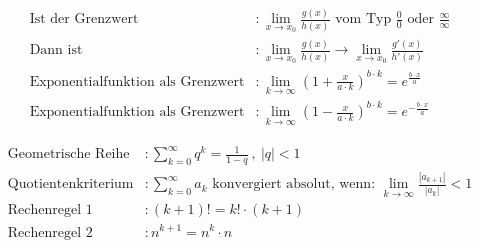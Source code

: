 \documentclass[12pt]{article}
\begin{document}
    \begin{tcolorbox}[
    colback=Green!5!white,
    colframe=Green!75!black,
    title={\centering Grenzwerte, L’Hospital}]
    \begin{align*}
        \text{Ist der Grenzwert} &: \lim_{x \to x_0} \frac{g(x)}{h(x)} \text{ vom Typ } \frac{0}{0} \text{ oder } \frac{\infty}{\infty} \\
        \text{Dann ist} &: \lim_{x \to x_0} \frac{g(x)}{h(x)} \longrightarrow \lim_{x \to x_0} \frac{g'(x)}{h'(x)} \\
        \text{Exponentialfunktion als Grenzwert} &: \lim_{k \to \infty} (1+\frac{x}{a \cdot k})^{b \cdot k} = e^{\frac{b \cdot x}{a}} \\
        \text{Exponentialfunktion als Grenzwert} &: \lim_{k \to \infty} (1-\frac{x}{a \cdot k})^{b \cdot k} = {e^{-\frac{b \cdot x}{a}}}
    \end{align*}
    \end{tcolorbox}
    
    \begin{tcolorbox}[
    colback=Blue!5!white,
    colframe=Blue!75!black,
    title={\centering Reihen, Quotientenkriterium}]
    \begin{align*}
        \text{Geometrische Reihe} &: \sum_{k=0}^{\infty} q^k = \frac{1}{1-q} \: , \: |q|<1 \\
        \text{Quotientenkriterium} &: \sum_{k=0}^{\infty} a_k \text{ konvergiert absolut, wenn: } \lim_{k \to \infty} \frac{|a_{k+1}|}{|a_k|} < 1 \\
        \text{Rechenregel 1} &: (k+1)! = k! \cdot (k+1) \\
        \text{Rechenregel 2} &: n^{k+1} = n^{k} \cdot n
    \end{align*}
    \end{tcolorbox}
\end{document}
